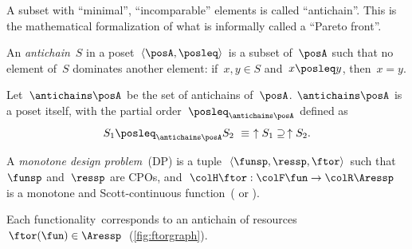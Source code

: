 A subset with ``minimal'', ``incomparable'' elements is called
``antichain''. This is the mathematical formalization of what is
informally called a ``Pareto front''.


\begin{definition}
    An \emph{antichain}~$S$ in a poset~$\left\langle \posA,\posleq\right\rangle $
    is a subset of~$\posA$ such that no element of~$S$ dominates another
    element: if~$x,y\in S$ and~$x\posleq y$, then~$x=y$.
\end{definition}
\begin{lemma}
    Let~$\antichains\posA$ be the set of antichains of~$\posA$. $\antichains\posA$
    is a poset itself, with the partial order~$\posleq_{\antichains\posA}$
    defined as
    \begin{equation}
        S_{1}\posleq_{\antichains\posA}S_{2}\ \equiv\ \uparrow S_{1}\supseteq\,\uparrow S_{2}.\label{eq:orderantichains}
    \end{equation}
\end{lemma}
\begin{definition}
    \label{def:A-monotone-design}A\emph{ monotone design problem~}(DP)
    is a tuple~$\left\langle \funsp,\ressp,\ftor\right\rangle $ such
    that~$\funsp$ and~$\ressp$ are CPOs, and~${\colH\ftor}:{\colF\fun}\rightarrow{\colR\Aressp}$
    is a monotone and Scott-continuous function~(\cite{gierz03continuous}
    or \cite[Definition 11]{censi16codesign_sep16}).
\end{definition}

\noindent Each functionality~\fun corresponds to an antichain
of resources~$\ftor(\fun)\in\Aressp$~(\cref{fig:ftorgraph}).


